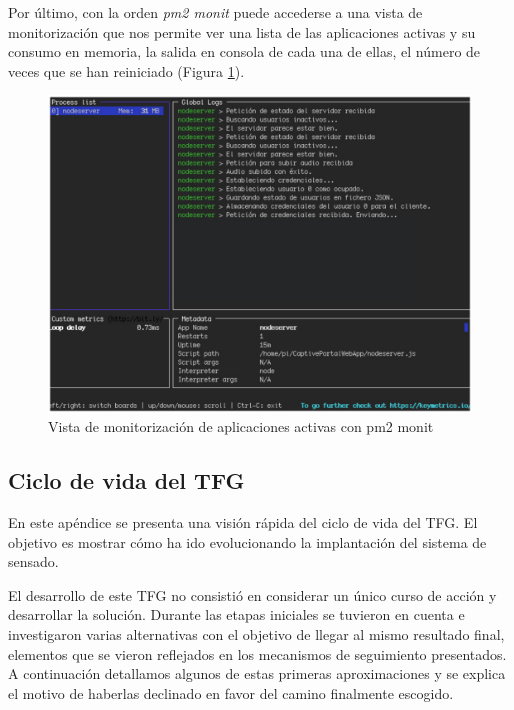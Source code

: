 \begin{appendices}
Por último, con la orden \emph{pm2 monit} puede accederse a una vista de monitorización que nos permite ver una lista de las aplicaciones activas y su consumo en memoria, la salida en consola de cada una de ellas, el número de veces que se han reiniciado (Figura \ref{pm2monit}).

\begin{figure}[!t]
\begin{center}
\includegraphics[width=0.75\linewidth]{./X_Anexos/Img/pm2monit.png}
\end{center}
\caption{Vista de monitorización de aplicaciones activas con pm2 monit}
\label{pm2monit}
\end{figure}
\cleardoublepage
{}%
\begin{center}
\begin{minipage}{.75\textwidth}
\section{Ciclo de vida del TFG}\label{ApendiceD}

En este apéndice se presenta una visión rápida del ciclo de vida del TFG. El objetivo es mostrar cómo ha ido evolucionando la implantación del sistema de sensado.
\end{minipage}
\end{center}
\clearpage%

El desarrollo de este TFG no consistió en considerar un único curso de acción y desarrollar la solución. Durante las etapas iniciales se tuvieron en cuenta e investigaron varias alternativas con el objetivo de llegar al mismo resultado final, elementos que se vieron reflejados en los mecanismos de seguimiento presentados. A continuación detallamos algunos de estas primeras aproximaciones y se explica el motivo de haberlas declinado en favor del camino finalmente escogido.


\end{appendices}
